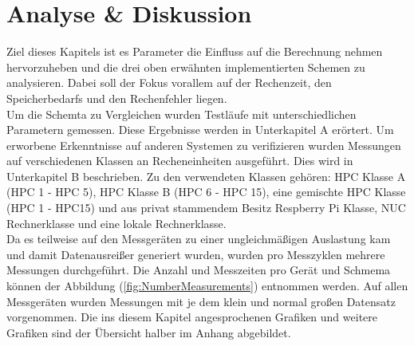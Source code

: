 \section{Analyse \& Diskussion}
\label{sec:analyse_diskussion}
Ziel dieses Kapitels ist es Parameter die Einfluss auf die Berechnung nehmen hervorzuheben und die drei oben erw\"ahnten implementierten Schemen zu analysieren. Dabei soll der Fokus vorallem auf der Rechenzeit, den Speicherbedarfs und den Rechenfehler liegen. \\ Um die  Schemta zu Vergleichen wurden Testl\"aufe mit unterschiedlichen Parametern gemessen. Diese Ergebnisse werden in Unterkapitel A er\"ortert. Um erworbene Erkenntnisse auf anderen Systemen zu verifizieren wurden Messungen auf verschiedenen Klassen an Recheneinheiten ausgef\"uhrt. Dies wird in Unterkapitel B beschrieben. Zu den verwendeten Klassen geh\"oren: HPC Klasse A (HPC 1 - HPC 5), HPC Klasse B (HPC 6 - HPC 15), eine gemischte HPC Klasse (HPC 1 - HPC15) und aus privat stammendem Besitz  Respberry Pi Klasse, NUC Rechnerklasse und eine lokale Rechnerklasse. \\ Da es teilweise auf den Messger\"aten zu einer ungleichm\"a\ss{}igen Auslastung kam und damit Datenausrei\ss{}er generiert wurden, wurden pro Messzyklen mehrere Messungen durchgef\"uhrt. Die Anzahl und Messzeiten pro Ger\"at und Schmema k\"onnen der Abbildung (\ref{fig:NumberMeasurements}) entnommen werden. Auf allen Messger\"aten wurden Messungen mit je dem klein und normal gro\ss{}en Datensatz vorgenommen. Die ins diesem Kapitel angesprochenen Grafiken und weitere Grafiken sind der \"Ubersicht halber im Anhang abgebildet.

